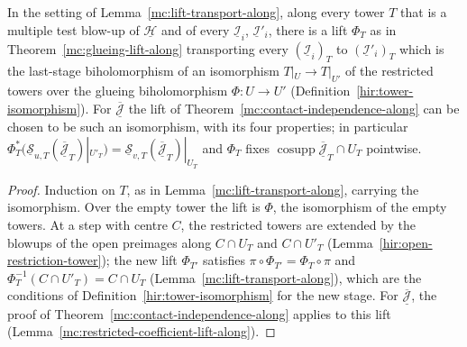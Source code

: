 \begin{theorem}
\label{mc:glueing-lift-tower-isomorphism}
\leanok
In the setting of Lemma~\ref{mc:lift-transport-along}, along every tower \(T\) that is a multiple test blow-up of \(\underline{\mathcal H}\) and of every \(\underline{\mathcal I}_i\),
\(\underline{\mathcal I}'_i\), there is a lift \(\Phi_T\) as in Theorem~\ref{mc:glueing-lift-along} transporting every \((\underline{\mathcal I}_i)_T\) to \((\underline{\mathcal I}'_i)_T\) which
is the last-stage biholomorphism of an isomorphism \(T|_U\to T|_{U'}\) of the restricted towers over the glueing biholomorphism \(\Phi\colon U\to U'\)
(Definition~\ref{hir:tower-isomorphism}). For \(\overline{\underline{\mathcal J}}\) the lift of Theorem~\ref{mc:contact-independence-along} can be chosen to be such an isomorphism,
with its four properties; in particular \(\Phi_T^*(\underline{\mathcal S}_{u,T}(\overline{\underline{\mathcal J}}_T)|_{U'_T})=\underline{\mathcal S}_{v,T}(\overline{\underline{\mathcal J}}_T)|_{U_T}\)
and \(\Phi_T\) fixes \(\operatorname{cosupp}\overline{\underline{\mathcal J}}_T\cap U_T\) pointwise.
\end{theorem}
\begin{proof}
\leanok
Induction on \(T\), as in Lemma~\ref{mc:lift-transport-along}, carrying the isomorphism. Over the empty tower the lift is \(\Phi\), the isomorphism of the empty towers.
At a step with centre \(C\), the restricted towers are extended by the blowups of the open preimages along \(C\cap U_T\) and \(C\cap U'_T\)
(Lemma~\ref{hir:open-restriction-tower}); the new lift \(\Phi_{T'}\) satisfies \(\pi\circ\Phi_{T'}=\Phi_T\circ\pi\) and \(\Phi_T^{-1}(C\cap U'_T)=C\cap U_T\) (Lemma~\ref{mc:lift-transport-along}), which are the conditions of Definition~\ref{hir:tower-isomorphism} for the new stage. For
\(\overline{\underline{\mathcal J}}\), the proof of Theorem~\ref{mc:contact-independence-along} applies to this lift (Lemma~\ref{mc:restricted-coefficient-lift-along}).
\end{proof}

